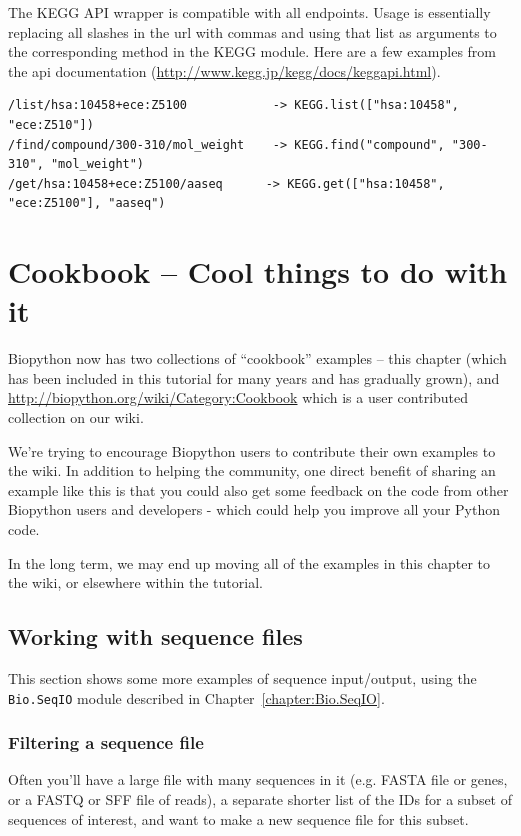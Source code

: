\documentclass{report}
\begin{document}
The KEGG API wrapper is compatible with all endpoints. Usage is essentially replacing all slashes in the url with commas and using that list as arguments to the corresponding method in the KEGG module. Here are a few examples from the api documentation (\url{http://www.kegg.jp/kegg/docs/keggapi.html}).

\begin{verbatim}
/list/hsa:10458+ece:Z5100	         -> KEGG.list(["hsa:10458", "ece:Z510"])
/find/compound/300-310/mol_weight	 -> KEGG.find("compound", "300-310", "mol_weight")
/get/hsa:10458+ece:Z5100/aaseq	    -> KEGG.get(["hsa:10458", "ece:Z5100"], "aaseq")
\end{verbatim}

\chapter{Cookbook -- Cool things to do with it}
\label{chapter:cookbook}

Biopython now has two collections of ``cookbook'' examples -- this chapter
(which has been included in this tutorial for many years and has gradually
grown), and \url{http://biopython.org/wiki/Category:Cookbook} which is a
user contributed collection on our wiki.

We're trying to encourage Biopython users to contribute their own examples
to the wiki. In addition to helping the community, one direct benefit of
sharing an example like this is that you could also get some feedback on
the code from other Biopython users and developers - which could help you
improve all your Python code.

In the long term, we may end up moving all of the examples in this chapter
to the wiki, or elsewhere within the tutorial.

\section{Working with sequence files}
\label{seq:cookbook-sequences}

This section shows some more examples of sequence input/output, using the
\verb|Bio.SeqIO| module described in Chapter~\ref{chapter:Bio.SeqIO}.

\subsection{Filtering a sequence file}

Often you'll have a large file with many sequences in it (e.g. FASTA file
or genes, or a FASTQ or SFF file of reads), a separate shorter list of
the IDs for a subset of sequences of interest, and want to make a new
sequence file for this subset.
\end{document}
